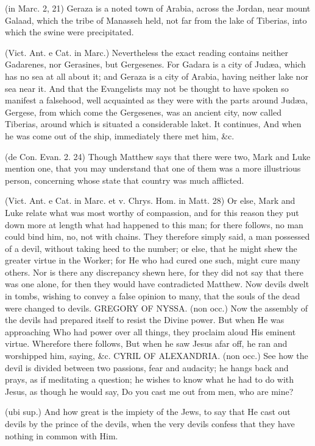  (in Marc. 2, 21) Geraza is a noted town of Arabia, across the Jordan, near mount Galaad, which the tribe of Manasseh held, not far from the lake of Tiberias, into which the swine were precipitated.

 (Vict. Ant. e Cat. in Marc.) Nevertheless the exact reading contains neither Gadarenes, nor Gerasines, but Gergesenes. For Gadara is a city of Judæa, which has no sea at all about it; and Geraza is a city of Arabia, having neither lake nor sea near it. And that the Evangelists may not be thought to have spoken so manifest a falsehood, well acquainted as they were with the parts around Judæa, Gergese, from which come the Gergesenes, was an ancient city, now called Tiberias, around which is situated a considerable laket. It continues, And when he was come out of the ship, immediately there met him, \&c.

 (de Con. Evan. 2. 24) Though Matthew says that there were two, Mark and Luke mention one, that you may understand that one of them was a more illustrious person, concerning whose state that country was much afflicted.

 (Vict. Ant. e Cat. in Marc. et v. Chrys. Hom. in Matt. 28) Or else, Mark and Luke relate what was most worthy of compassion, and for this reason they put down more at length what had happened to this man; for there follows, no man could bind him, no, not with chains. They therefore simply said, a man possessed of a devil, without taking heed to the number; or else, that he might shew the greater virtue in the Worker; for He who had cured one such, might cure many others. Nor is there any discrepancy shewn here, for they did not say that there was one alone, for then they would have contradicted Matthew. Now devils dwelt in tombs, wishing to convey a false opinion to many, that the souls of the dead were changed to devils. GREGORY OF NYSSA. (non occ.) Now the assembly of the devils had prepared itself to resist the Divine power. But when He was approaching Who had power over all things, they proclaim aloud His eminent virtue. Wherefore there follows, But when he saw Jesus afar off, he ran and worshipped him, saying, \&c. CYRIL OF ALEXANDRIA. (non occ.) See how the devil is divided between two passions, fear and audacity; he hangs back and prays, as if meditating a question; he wishes to know what he had to do with Jesus, as though he would say, Do you cast me out from men, who are mine?

 (ubi sup.) And how great is the impiety of the Jews, to say that He cast out devils by the prince of the devils, when the very devils confess that they have nothing in common with Him.

